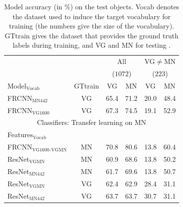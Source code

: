 \begin{table}[t]
	\centering
	\small
	\begin{tabular}{@{~}l@{~}|@{~}c@{~}|cc|cc@{~}}
		\toprule
		&  & \multicolumn{2}{c}{All} 
		& \multicolumn{2}{c}{VG$\neq$MN}\\
		&  & \multicolumn{2}{c}{($1072$)} 
		& \multicolumn{2}{c}{($223$)}\\	
		Model$_{\text{Vocab}}$ 
		&  GTtrain &  VG & MN 
		&  VG & MN \\ 
		\midrule
		FRCNN$_{\text{MN442}}$ & VG &  65.4 &      71.2 &   20.0 &      48.4  \\
		FRCNN$_{\text{VG1600}}$ & VG &    67.3 &      74.5 &    19.1 &      52.9  \\
		\midrule \midrule
		\multicolumn{6}{c}{Classifiers: Transfer learning on MN}\\
		Features$_{\text{Vocab}}$ &   \\
		\midrule 
		FRCNN$_{\text{VG1600}}$$_{\text{-VGMN}}$ & MN &    70.8 &      80.6 &    13.8 &      60.4  \\ 
		\midrule
		ResNet$_{\text{VGMN}}$ & MN  & 60.9 &  68.6 &  13.8 & 50.2  \\
		
		ResNet$_{\text{MN442}}$ & MN &            61.7 &              69.6 &                        13.8 &              50.7 \\
		ResNet$_{\text{VGMN}}$  &   VG &  62.4 &              62.9 &              28.4 &              31.1  \\
		ResNet$_{\text{MN442}}$ & VG  &            63.7 &              63.7 &                  30.7 &              31.1  \\
		\bottomrule
	\end{tabular}
	\caption{Model accuracy (in \%) on the \mn test objects. Vocab denotes the dataset used to induce the target vocabulary for training (the numbers give the size of the vocabulary). GTtrain gives the dataset that provides the ground truth labels during training, and VG and MN for testing \label{tab:exp_VGvsMN}.}
\end{table}




